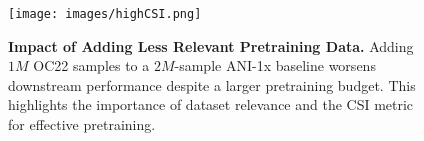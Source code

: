 


\begin{figure}[b!]
    \centering
    \texttt{[image: images/highCSI.png]}
    \vspace{-0.3cm}
    \caption{\textbf{Impact of Adding Less Relevant Pretraining Data.} Adding \(1M\) OC22 samples to a \(2M\)-sample ANI-1x baseline worsens downstream performance despite a larger pretraining budget. This highlights the importance of dataset relevance and the CSI metric for effective pretraining.}
    \label{fig:high_low_CSI}
\end{figure}
